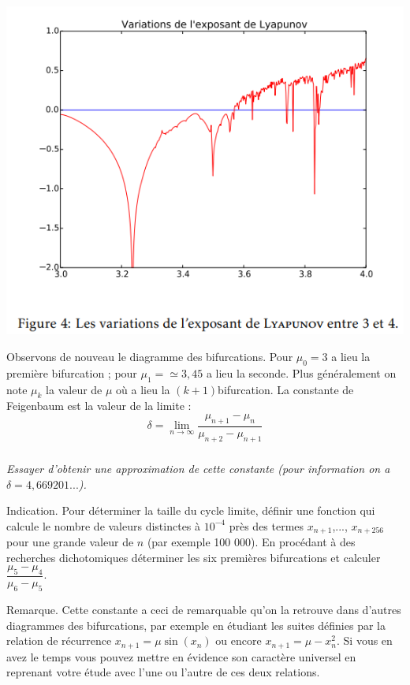 \begin{center}
\includegraphics[width=0.6\linewidth]{fig_04}
\end{center}


Observons de nouveau le diagramme des bifurcations. Pour $\mu_0 = 3$ a lieu la première bifurcation ; pour $\mu_1 = \simeq 3,45$ a lieu la seconde. Plus généralement on note $\mu_k$ la valeur de $\mu$ où a lieu la $(k + 1)$\ieme bifurcation. La constante de Feigenbaum est la valeur de la limite :
$$
\delta = \lim_{n \to \infty} \dfrac{\mu_{n+1}-\mu_{n}}{\mu_{n+2}-\mu_{n+1}}
$$

\subparagraph{}\textit{Essayer d’obtenir une approximation de cette constante (pour information on a $\delta = 4,669 201...$).}


Indication. Pour déterminer la taille du cycle limite, définir une fonction qui calcule le nombre de valeurs distinctes à $10^{-4}$ près des termes $x_{n+1}$,..., $x_{n+256}$ pour une grande valeur de $n$ (par exemple 100 000). En procédant à des recherches
dichotomiques déterminer les six premières bifurcations et calculer $\dfrac{\mu_5-\mu_4}{\mu_6-\mu_5}$.

Remarque. Cette constante a ceci de remarquable qu’on la retrouve dans d’autres diagrammes des bifurcations, par
exemple en étudiant les suites définies par la relation de récurrence $x_{n+1} = \mu\sin(x_n)$ ou encore $x_{n+1} = \mu  - x_n^2$. Si vous en avez le temps vous pouvez mettre en évidence son caractère universel en reprenant votre étude avec l’une ou l’autre de ces
deux relations.
